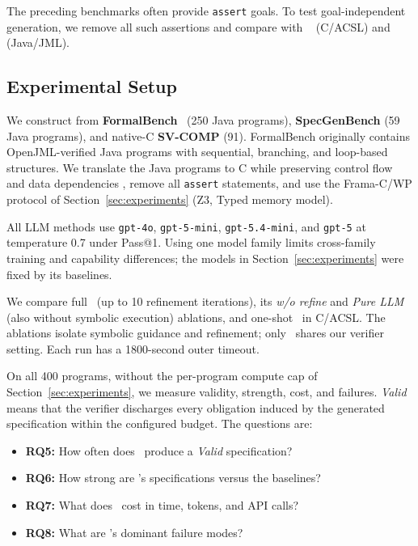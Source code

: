 \label{sec:large-scale-experiment}
The preceding benchmarks often provide \texttt{assert} goals. To test
goal-independent generation, we remove all such assertions and compare with
\autospec~\cite{autospec} (C/ACSL) and \specgen~\cite{SpecGen} (Java/JML).

\subsection{Experimental Setup}
We construct \textbf{} from \textbf{FormalBench}~\cite{le2025can}
(250 Java programs), \textbf{SpecGenBench} (59 Java programs), and native-C
\textbf{SV-COMP} (91). FormalBench originally contains OpenJML-verified Java
programs with sequential, branching, and loop-based structures. We translate
the Java programs to C while preserving
control flow and data dependencies ,
remove all \texttt{assert} statements, and use the Frama-C/WP protocol of
Section~\ref{sec:experiments} (Z3, Typed memory model).

All LLM methods use \texttt{gpt-4o}, \texttt{gpt-5-mini},
\texttt{gpt-5.4-mini}, and \texttt{gpt-5} at temperature 0.7 under Pass@1.
Using one model family limits cross-family training and capability differences;
the models in Section~\ref{sec:experiments} were fixed by its baselines.

We compare full \toolname\ (up to 10 refinement iterations), its \emph{w/o
refine} and \emph{Pure LLM} (also without symbolic execution) ablations, and
one-shot \autospec\ in C/ACSL.  The ablations isolate symbolic
guidance and refinement; only \autospec\ shares our verifier setting. Each
run has a 1800-second outer timeout.

On all 400 programs, without the per-program compute cap of
Section~\ref{sec:experiments}, we measure validity, strength, cost, and failures.
\emph{Valid} means that the verifier discharges every obligation induced by the
generated specification within the configured budget. The questions are:
\begin{itemize}
    \item \textbf{RQ5:} How often does \toolname\ produce a
    \emph{Valid} specification?
    \item \textbf{RQ6:} How strong are \toolname's specifications
    versus the baselines?
    \item \textbf{RQ7:} What does \toolname\ cost in time, tokens, and
    API calls?
    \item \textbf{RQ8:} What are \toolname's dominant failure modes?
\end{itemize}

